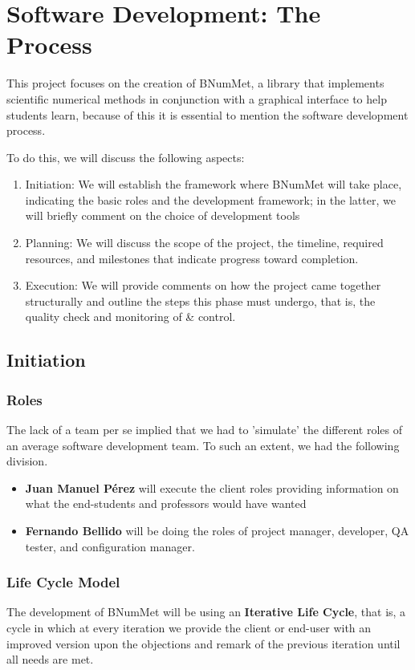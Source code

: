 \chapter{Software Development: The Process}
This project focuses on the creation of BNumMet, a library that implements scientific numerical methods in conjunction with a graphical interface to help students learn, because of this it is essential to mention the software development process. 

To do this, we will discuss the following aspects:
\begin{enumerate}
    \item Initiation: We will establish the framework where BNumMet will take place, indicating the basic roles and the development framework; in the latter, we will briefly comment on the choice of development tools
    \item Planning: We will discuss the scope of the project, the timeline, required resources, and milestones that indicate progress toward completion.
    \item Execution: We will provide comments on how the project came together structurally and outline the steps this phase must undergo, that is, the quality check and monitoring of \& control.
\end{enumerate}


\section{Initiation}
\subsection{Roles}
The lack of a team per se implied that we had to 'simulate' the different roles of an average software development team.
To such an extent, we had the following division.
\begin{itemize}
    \item \textbf{Juan Manuel Pérez} will execute the client roles providing information on what the end-students and professors would have wanted
    \item \textbf{Fernando Bellido} will be doing the roles of project manager, developer, QA tester, and configuration manager.
\end{itemize}

\subsection{Life Cycle Model}
The development of BNumMet will be using an \textbf{Iterative Life Cycle}, that is, a cycle in which at every iteration we provide the client or end-user with an improved version upon the objections and remark of the previous iteration until all needs are met.


